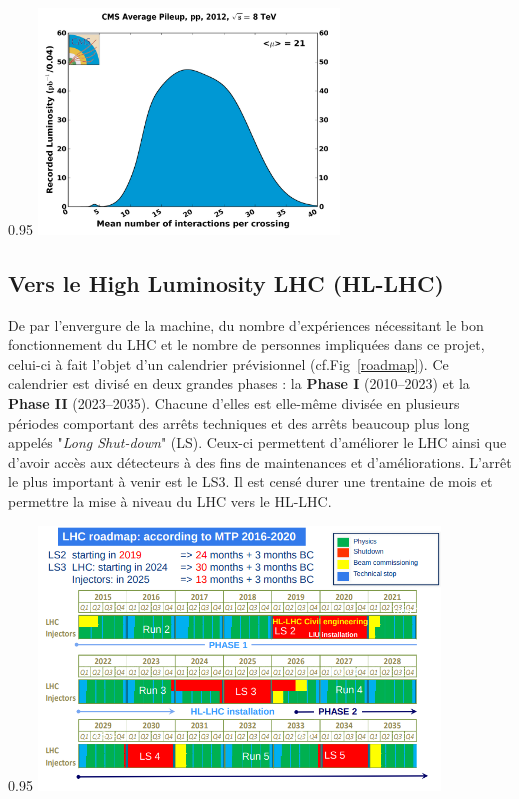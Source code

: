 \begin{minipagewithmarginpars}[ht!]{0.95\textwidth}
	\centering
	\includegraphics[width=0.60\textwidth]{LHC/pileup.png}
	\label{pile-up}	
\end{minipagewithmarginpars}

\subsection{Vers le High Luminosity LHC (HL-LHC)}
De par l'envergure de la machine, du nombre d'expériences nécessitant le bon fonctionnement du LHC et le nombre de personnes impliquées dans ce projet, celui-ci à fait l'objet d'un calendrier prévisionnel (cf.Fig~\ref{roadmap}). Ce calendrier est divisé en deux grandes phases : la \textbf{Phase I} (\num{2010}--\num{2023}) et la  \textbf{Phase II} (\num{2023}--\num{2035}). Chacune d'elles est elle-même divisée en plusieurs périodes comportant des arrêts techniques et des arrêts beaucoup plus long appelés "\textit{Long Shut-down}" (LS). Ceux-ci permettent d'améliorer le LHC ainsi que d'avoir accès aux détecteurs à des fins de maintenances et d'améliorations. L'arrêt le plus important à venir est le LS3. Il est censé durer une trentaine de mois et permettre la mise à niveau du LHC vers le HL-LHC.

\begin{minipagewithmarginpars}[ht!]{0.95\textwidth}
	\centering
	\includegraphics[width=0.80\textwidth]{LHC/roadmap.png}
	\label{roadmap}	
\end{minipagewithmarginpars}

